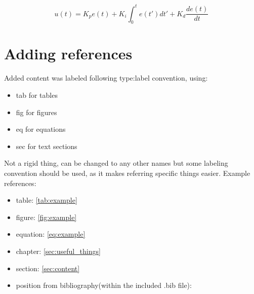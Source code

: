 \documentclass[12pt]{report}
\begin{document}
\begin{equation}
\label{eq:example}
 u(t)=K_{p}e(t) + K_{i} \int_{0}^{t}e(t')dt'+K_{d}\frac{de(t)}{dt}
\end{equation}

\section{Adding references}
Added content was labeled following type:label convention, using:
\begin{itemize}
\item tab for tables
\item fig for figures
\item eq for equations
\item sec for text sections
\end{itemize}
Not a rigid thing, can be changed to any other names but some labeling convention should be used, as it makes referring specific things easier.
Example references:
\begin{itemize}
\item table: \autoref{tab:example}
\item figure: \autoref{fig:example}
\item equation: \autoref{eq:example}
\item chapter: \autoref{sec:useful_things}
\item section: \autoref{sec:content}
\item position from bibliography(within the included .bib file): \cite{ref_key}
\end{itemize}



	
\end{document}
